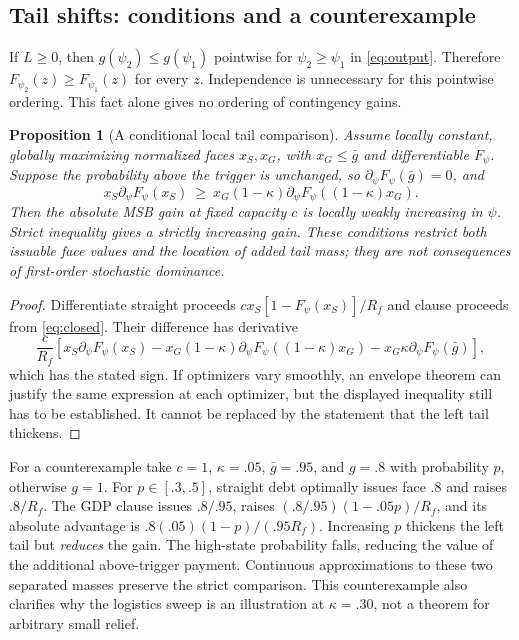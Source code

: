 \documentclass[11pt]{article}
\newtheorem{proposition}{Proposition}
\begin{document}
\subsection{Tail shifts: conditions and a counterexample}\label{app:tails}
If $L\ge0$, then $g(\psi_2)\le g(\psi_1)$ pointwise for $\psi_2\ge\psi_1$ in \eqref{eq:output}. Therefore $F_{\psi_2}(z)\ge F_{\psi_1}(z)$ for every $z$. Independence is unnecessary for this pointwise ordering. This fact alone gives no ordering of contingency gains.
\begin{proposition}[A conditional local tail comparison]\label{prop:tails}
Assume locally constant, globally maximizing normalized faces $x_S,x_G$, with $x_G\le\bar g$ and differentiable $F_\psi$. Suppose the probability above the trigger is unchanged, so $\partial_\psi F_\psi(\bar g)=0$, and
\[
 x_S\partial_\psi F_\psi(x_S)\ \ge\
 x_G(1-\kappa)\partial_\psi F_\psi((1-\kappa)x_G).
\]
Then the \emph{absolute} MSB gain at fixed capacity $c$ is locally weakly increasing in $\psi$. Strict inequality gives a strictly increasing gain. These conditions restrict both issuable face values and the location of added tail mass; they are not consequences of first-order stochastic dominance.
\end{proposition}
\begin{proof}
Differentiate straight proceeds $cx_S[1-F_\psi(x_S)]/R_f$ and clause proceeds from \eqref{eq:closed}. Their difference has derivative
\[
 \frac c{R_f}\left[x_S\partial_\psi F_\psi(x_S)
 -x_G(1-\kappa)\partial_\psi F_\psi((1-\kappa)x_G)
 -x_G\kappa\partial_\psi F_\psi(\bar g)\right],
\]
which has the stated sign. If optimizers vary smoothly, an envelope theorem can justify the same expression at each optimizer, but the displayed inequality still has to be established. It cannot be replaced by the statement that the left tail thickens.
\end{proof}
For a counterexample take $c=1$, $\kappa=.05$, $\bar g=.95$, and $g=.8$ with probability $p$, otherwise $g=1$. For $p\in[.3,.5]$, straight debt optimally issues face .8 and raises $.8/R_f$. The GDP clause issues $.8/.95$, raises $(.8/.95)(1-.05p)/R_f$, and its absolute advantage is $.8(.05)(1-p)/(.95R_f)$. Increasing $p$ thickens the left tail but \emph{reduces} the gain. The high-state probability falls, reducing the value of the additional above-trigger payment. Continuous approximations to these two separated masses preserve the strict comparison. This counterexample also clarifies why the logistics sweep is an illustration at $\kappa=.30$, not a theorem for arbitrary small relief.
\end{document}
